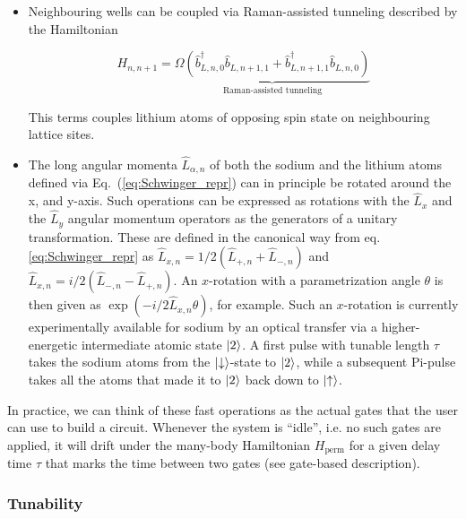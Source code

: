 \documentclass[a4paper, 10pt]{article}
\begin{document}
    \begin{itemize}
        \item Neighbouring wells can be coupled via Raman-assisted tunneling described by the Hamiltonian
        
        \begin{equation}
        H_{n, n+1} = \underbrace{\Omega \left( \hat{b}_{L, n, 0}^\dagger  \hat{b}_{L, n+1, 1} + \hat{b}_{L, n+1, 1}^\dagger  \hat{b}_{L, n, 0} \right)}_{\text{Raman-assisted tunneling}}
        \end{equation}
        
        This terms couples lithium atoms of opposing spin state on neighbouring lattice sites. 
        
        \item The long angular momenta $\hat{L}_{\alpha, n}$ of both the sodium and the lithium atoms defined via Eq.~(\ref{eq:Schwinger_repr}) can in principle be rotated around the x, and y-axis.
        Such operations can be expressed as rotations with the $\hat{L}_x$ and the $\hat{L}_y$ angular momentum operators as the generators of a unitary transformation.
        These are defined in the canonical way from eq. \ref{eq:Schwinger_repr} as $\hat{L}_{x, n} = 1/2 (\hat{L}_{+, n}+\hat{L}_{-, n})$ and $\hat{L}_{x, n} = i/2 (\hat{L}_{-, n}-\hat{L}_{+, n})$. An $x$-rotation with a parametrization angle $\theta $ is then given as $\exp{\left(-i/2 \hat{L}_{x, n} \theta\right)} $, for example.
        Such an $x$-rotation is currently experimentally available for sodium by an optical transfer via a higher-energetic intermediate atomic state $\ket{2}$.
        A first pulse with tunable length $\tau$ takes the sodium atoms from the $\ket{\downarrow}$-state to $\ket{2}$, while a subsequent Pi-pulse takes all the atoms that made it to $\ket{2}$ back down to $\ket{\uparrow}$.
        
    \end{itemize}

    In practice, we can think of these fast operations as the actual gates that the user can use to build a circuit.
    Whenever the system is ``idle'', i.e. no such gates are applied, it will drift under the many-body Hamiltonian $H_{\text{perm}}$ for a given delay time $\tau$ that marks the time between two gates (see gate-based description).  
    
    \subsubsection{Tunability}
    
\end{document}
